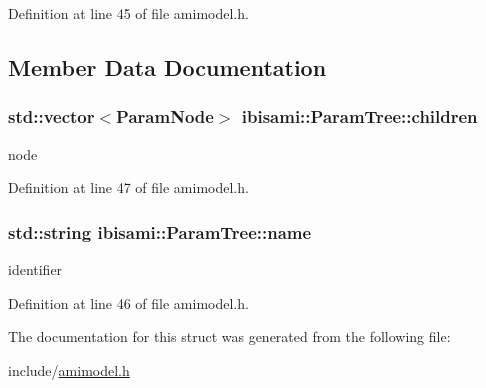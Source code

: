Definition at line 45 of file amimodel.\+h.



\subsection{Member Data Documentation}
\hypertarget{structibisami_1_1_param_tree_a512771aaec7a303ebcafd7c66812dd7f}{}
\subsubsection[{children}]{\setlength{\rightskip}{0pt plus 5cm}std\+::vector$<${\bf Param\+Node}$>$ ibisami\+::\+Param\+Tree\+::children}\label{structibisami_1_1_param_tree_a512771aaec7a303ebcafd7c66812dd7f}


node 



Definition at line 47 of file amimodel.\+h.

\hypertarget{structibisami_1_1_param_tree_a6776eb67c955420e87360ed764bc5cf3}{}
\subsubsection[{name}]{\setlength{\rightskip}{0pt plus 5cm}std\+::string ibisami\+::\+Param\+Tree\+::name}\label{structibisami_1_1_param_tree_a6776eb67c955420e87360ed764bc5cf3}


identifier 



Definition at line 46 of file amimodel.\+h.



The documentation for this struct was generated from the following file\+:\begin{DoxyCompactItemize}
\item 
include/\hyperlink{amimodel_8h}{amimodel.\+h}\end{DoxyCompactItemize}
